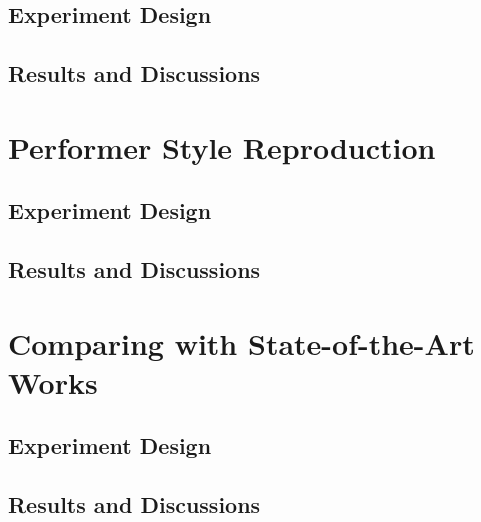 \subsection{Experiment Design}

\subsection{Results and Discussions}

\section{Performer Style Reproduction}
\subsection{Experiment Design}

\subsection{Results and Discussions}
\section{Comparing with State-of-the-Art Works}
\subsection{Experiment Design}
\subsection{Results and Discussions}

